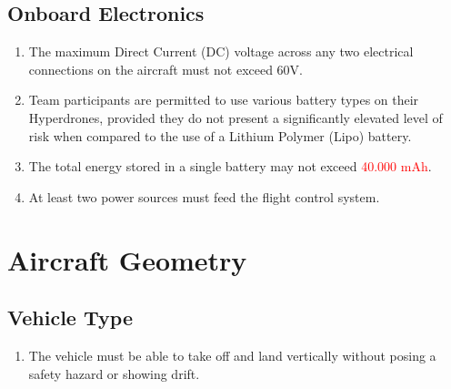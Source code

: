 \documentclass{article}
\begin{document}
\subsection{Onboard Electronics}
\begin{enumerate}
  \item The maximum Direct Current (DC) voltage across any two electrical connections on the aircraft must not exceed 60V.
  \item Team participants are permitted to use various battery types on their Hyperdrones, provided they do not present a significantly elevated level of risk when compared to the use of a Lithium Polymer (Lipo) battery. 
  \item The total energy stored in a single battery may not exceed \textcolor{red}{40.000 mAh}.
  \item At least two power sources must feed the flight control system. 
\end{enumerate}



\section{Aircraft Geometry}

\subsection{Vehicle Type}
\begin{enumerate}
  \item The vehicle must be able to take off and land vertically without posing a safety hazard or showing drift.  
\end{enumerate}
\end{document}
